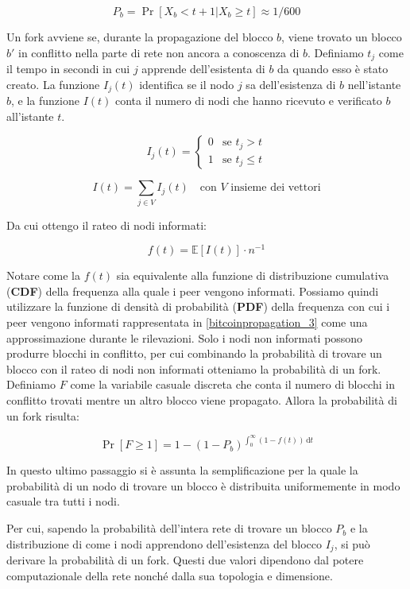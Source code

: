\[ P_b = \Pr\left[ X_b < t + 1 | X_b \geq t\right] \approx 1/600 \]

Un fork avviene se, durante la propagazione del blocco $b$, viene trovato un blocco $b'$ in conflitto nella parte di rete non ancora a conoscenza di $b$. Definiamo $t_j$ come il tempo in secondi in cui $j$ apprende dell'esistenta di $b$ da quando esso è stato creato. La funzione $I_{j}(t)$ identifica se il nodo $j$ sa dell'esistenza di $b$ nell'istante $b$, e la funzione $I(t)$ conta il numero di nodi che hanno ricevuto e verificato $b$ all'istante $t$.

\[ I_{j}(t) = \begin{cases}
    0 &\textrm{se } t_j > t \\
    1 &\textrm{se } t_j \leq t
\end{cases}\]

\[ I(t) = \sum_{j \in V} I_{j}(t) \quad  \textrm{con }V\textrm{ insieme dei vettori} \]

Da cui ottengo il rateo di nodi informati:

\[ f(t) = \mathbb{E}[I(t)] \cdot n^{-1} \]

Notare come la $f(t)$ sia equivalente alla funzione di distribuzione cumulativa (\textbf{CDF}) della frequenza alla quale i peer vengono informati. Possiamo quindi utilizzare la funzione di densità di probabilità (\textbf{PDF}) della frequenza con cui i peer vengono informati rappresentata in \ref{bitcoinpropagation_3} come una approssimazione durante le rilevazioni. Solo i nodi non informati possono produrre blocchi in conflitto, per cui combinando la probabilità di trovare un blocco con il rateo di nodi non informati otteniamo la probabilità di un fork. Definiamo $F$ come la variabile casuale discreta che conta il numero di blocchi in conflitto trovati mentre un altro blocco viene propagato. Allora la probabilità di un fork risulta:

\[ \Pr\left[F \geq 1\right] = 1 - (1 - P_b)^{\int_{0}^{\infty} \! (1 - f(t)) \, \mathrm{d}t} \]

In questo ultimo passaggio si è assunta la semplificazione per la quale la probabilità di un nodo di trovare un blocco è distribuita uniformemente in modo casuale tra tutti i nodi.

Per cui, sapendo la probabilità dell'intera rete di trovare un blocco $P_b$ e la distribuzione di come i nodi apprendono dell'esistenza del blocco $I_j$, si può derivare la probabilità di un fork. Questi due valori dipendono dal potere computazionale della rete nonché dalla sua topologia e dimensione.

